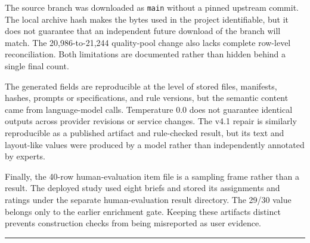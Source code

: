 The source branch was downloaded as \texttt{main} without a pinned upstream commit. The local archive hash makes the bytes used in the project identifiable, but it does not guarantee that an independent future download of the branch will match. The 20,986-to-21,244 quality-pool change also lacks complete row-level reconciliation. Both limitations are documented rather than hidden behind a single final count.

The generated fields are reproducible at the level of stored files, manifests, hashes, prompts or specifications, and rule versions, but the semantic content came from language-model calls. Temperature 0.0 does not guarantee identical outputs across provider revisions or service changes. The v4.1 repair is similarly reproducible as a published artifact and rule-checked result, but its text and layout-like values were produced by a model rather than independently annotated by experts.

Finally, the 40-row human-evaluation item file is a sampling frame rather than a result. The deployed study used eight briefs and stored its assignments and ratings under the separate human-evaluation result directory. The 29/30 value belongs only to the earlier enrichment gate. Keeping these artifacts distinct prevents construction checks from being misreported as user evidence.

\begin{center}\rule{0.5\linewidth}{0.5pt}\end{center}
